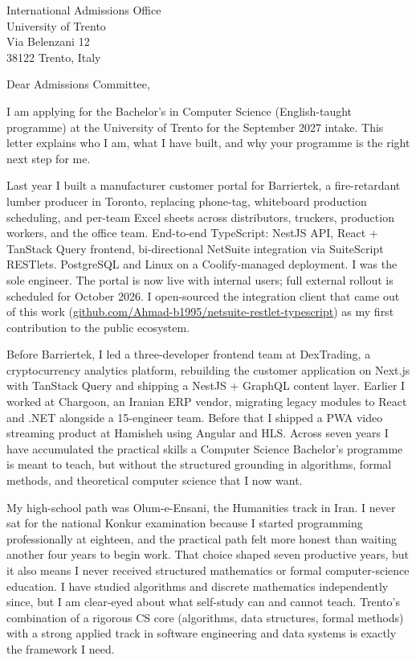 




\begin{letter}{
  International Admissions Office\\
  University of Trento\\
  Via Belenzani 12\\
  38122 Trento, Italy
}

\opening{Dear Admissions Committee,}

I am applying for the Bachelor's in Computer Science (English-taught programme) at the University of Trento for the September 2027 intake. This letter explains who I am, what I have built, and why your programme is the right next step for me.

Last year I built a manufacturer customer portal for Barriertek, a fire-retardant lumber producer in Toronto, replacing phone-tag, whiteboard production scheduling, and per-team Excel sheets across distributors, truckers, production workers, and the office team. End-to-end TypeScript: NestJS API, React + TanStack Query frontend, bi-directional NetSuite integration via SuiteScript RESTlets. PostgreSQL and Linux on a Coolify-managed deployment. I was the sole engineer. The portal is now live with internal users; full external rollout is scheduled for October 2026. I open-sourced the integration client that came out of this work (\href{https://github.com/Ahmad-b1995/netsuite-restlet-typescript}{github.com/Ahmad-b1995/netsuite-restlet-typescript}) as my first contribution to the public ecosystem.

Before Barriertek, I led a three-developer frontend team at DexTrading, a cryptocurrency analytics platform, rebuilding the customer application on Next.js with TanStack Query and shipping a NestJS + GraphQL content layer. Earlier I worked at Chargoon, an Iranian ERP vendor, migrating legacy modules to React and .NET alongside a 15-engineer team. Before that I shipped a PWA video streaming product at Hamisheh using Angular and HLS. Across seven years I have accumulated the practical skills a Computer Science Bachelor's programme is meant to teach, but without the structured grounding in algorithms, formal methods, and theoretical computer science that I now want.

My high-school path was Olum-e-Ensani, the Humanities track in Iran. I never sat for the national Konkur examination because I started programming professionally at eighteen, and the practical path felt more honest than waiting another four years to begin work. That choice shaped seven productive years, but it also means I never received structured mathematics or formal computer-science education. I have studied algorithms and discrete mathematics independently since, but I am clear-eyed about what self-study can and cannot teach. Trento's combination of a rigorous CS core (algorithms, data structures, formal methods) with a strong applied track in software engineering and data systems is exactly the framework I need.


\end{letter}
